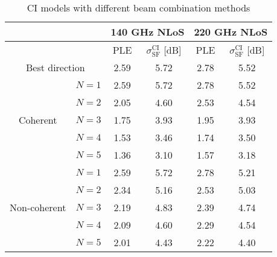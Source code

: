 \documentclass[conference]{IEEEtran}
\begin{document}
\begin{table}[htbp]
  \centering
  \caption{CI models with different beam combination methods}
    \begin{tabular}{|c|c|c|c|c|c|}
    \hline
          &       & \multicolumn{2}{c|}{140 GHz NLoS} & \multicolumn{2}{c|}{220 GHz NLoS}  \\
    \hline
          &       & PLE   & $\sigma_{\text{SF}}^{\text{CI}}$ [dB] & PLE   & $\sigma_{\text{SF}}^{\text{CI}}$ [dB]  \\
    \hline
    \multicolumn{2}{|c|}{Best direction} & 2.59  & 5.72  & 2.78  & 5.52  \\
    \hline
    \multirow{5}{*}{Coherent} & $N=1$     & 2.59  & 5.72  & 2.78  & 5.52  \\
\cline{2-6}          & $N=2$     & 2.05  & 4.60  & 2.53  & 4.54  \\
\cline{2-6}          & $N=3$     & 1.75  & 3.93  & 1.95  & 3.93  \\
\cline{2-6}          & $N=4$     & 1.53  & 3.46  & 1.74  & 3.50  \\
\cline{2-6}          & $N=5$     & 1.36  & 3.10  & 1.57  & 3.18  \\
    \hline
    \multirow{5}{*}{Non-coherent} & $N=1$     & 2.59  & 5.72  & 2.78  & 5.21  \\
\cline{2-6}          & $N=2$     & 2.34  & 5.16  & 2.53  & 5.03  \\
\cline{2-6}          & $N=3$     & 2.19  & 4.83  & 2.39  & 4.74  \\
\cline{2-6}          & $N=4$     & 2.09  & 4.60  & 2.29  & 4.54  \\
\cline{2-6}          & $N=5$     & 2.01  & 4.43  & 2.22  & 4.40  \\
    \hline
    \end{tabular}%
  \label{tab:NLOS-PL}%
\end{table}%
\end{document}
